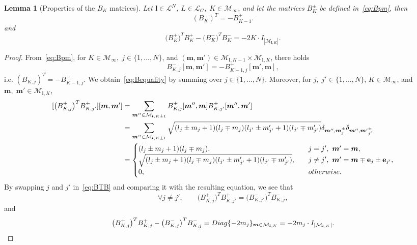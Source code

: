 \documentclass[10pt,a4paper]{amsart}
\newtheorem{lemma}{Lemma}
\def\Bm{B^{-}}
\def\Bp{B^{+}}
\def\Bpm{B^{\pm}}
\def\Nat{{N}}
\def\bbm{{\bm m}}
\def\bl{{\bm l}}
\def\calL{\mathcal{L}}
\def\calM{\mathcal{M}}
\newcommand{\card}[1]{|{#1}|}
\begin{document}
\begin{lemma}[Properties of the $B_K$ matrices]\label{lemma:laddar}
    Let $\bl\in\calL^N$, $L\in\calL_G,\;K\in\calM_\infty$, 
    and let the matrices $B_K^\pm$ be defined in~\eqref{eq:Bpm}, then
    \begin{equation}\label{eq:Bequality}
        (B_{K}^-)^T = -B_{{K-1}}^+.
    \end{equation}
    and
    \begin{equation}
        \big(\Bp_K\big)^T\Bp_K  - \big(\Bm_K\big)^T\Bm_K 
     = -2K\cdot I_{\card{\calM_{\bl,K}}}\label{eq:ladder2}.
    \end{equation}
\end{lemma}

\begin{proof}
From~\eqref{eq:Bpm}, for $K\in \calM_\infty,\;j\in \{1,\ldots, \Nat\}$, and $(\bbm,\bbm')\in\calM_{\bl,K-1}\times\calM_{\bl,K}$, there holds
\[
    \Bm_{K,j}[\bbm,\bbm'] = -\Bp_{K-1,j}[\bbm',\bbm],
\]
i.e.
    $(\Bm_{K,j})^T=-\Bp_{K-1,j}$.
We obtain~\eqref{eq:Bequality} by summing over $j\in\{1,\ldots, \Nat\}$.
Moreover, for $j,\;j'\in \{1,\ldots, \Nat\}$, $K\in \calM_\infty$, and $\bbm, \;\bbm'\in\calM_{\bl,K}$, 
\begin{equation}\label{eq:BTB}
\begin{split}
    [\big(\Bpm_{K,j}\big)^T \Bpm_{K,j'}][\bbm,\bbm']
    &= 
    \sum_{\bbm''\in\calM_{\bl,K\pm 1}}\Bpm_{K,j}[\bbm'',\bbm]\Bpm_{K,j'}[\bbm'',\bbm'] \\
    &= 
    \sum_{\bbm''\in\calM_{\bl,K\pm 1}}
    \sqrt{(l_j\pm m_j+1)(l_j\mp m_j)(l_{j'}\pm m'_{j'}+1)(l_{j'}\mp m'_{j'})}\delta_{\bbm'',\bbm_j^\pm}\delta_{\bbm'',{\bbm'}_{j'}^\pm}\\
    &= \begin{cases}
        (l_j\pm m_j+1)(l_j\mp m_j),
        \quad &j=j', ~\bbm' = \bbm, \\
        \sqrt{(l_j\pm m_j+1)(l_j\mp m_j)(l_{j'}\pm m'_{j'}+1)(l_{j'}\mp m'_{j'})},
        \quad &j\ne j', ~\bbm'=\bbm\mp{\bf e}_j\pm{\bf e}_{j'}, \\
        0, \qquad &\textup{otherwise.}
    \end{cases}
\end{split}
\end{equation}
By swapping $j$ and $j'$ in~\eqref{eq:BTB} and comparing it with the resulting equation, we see that
    \[
        \forall j\ne j', \qquad \big(\Bp_{K,j})^T \Bp_{K,j'} = \big(\Bm_{K,j'}\big)^T \Bm_{K,j},
    \]
    and
    \[
        \big(\Bp_{K,j}\big)^T\Bp_{K,j} - \big(\Bm_{K,j}\big)^T \Bm_{K,j} = \textup{Diag}\{-2m_j\}_{\bbm\in\calM_{\bl,K}} = -2m_j \cdot I_{\card{\calM_{\bl,K}}}.
\]
\end{proof}
\end{document}
